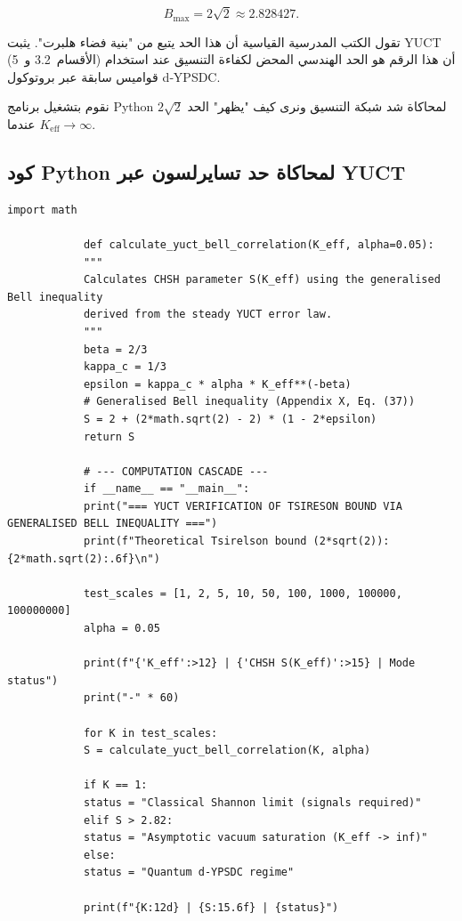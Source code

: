 \documentclass[11pt,a4paper]{article}
\makeatletter
\def\ttfamily{\@noligs\fontfamily\ttdefault\selectfont\sloppy}
\makeatother
\begin{document}
	\[
	B_{\mathrm{max}} = 2\sqrt{2} \approx 2.828427.
	\]
	
	تقول الكتب المدرسية القياسية أن هذا الحد يتبع من "بنية فضاء هلبرت". يثبت YUCT (الأقسام~3.2 و~5) أن هذا الرقم هو الحد الهندسي المحض لكفاءة التنسيق عند استخدام قواميس سابقة عبر بروتوكول d‑YPSDC.
	
	نقوم بتشغيل برنامج Python لمحاكاة شد شبكة التنسيق ونرى كيف "يظهر" الحد \(2\sqrt{2}\) عندما \(K_{\mathrm{eff}} \to \infty\).
	
	\subsection{كود Python لمحاكاة حد تسايرلسون عبر YUCT}
	
	\begin{tcolorbox}[
		colback=gray!5, 
		colframe=black!75, 
		title=كود YUCT Python: حد تسايرلسون عبر متراجحة بل المعممة,
		fonttitle=\small\ttfamily,
		arc=2mm,
		fontupper=\scriptsize,
		left=1mm, right=1mm,
		top=1mm, bottom=1mm
		]
		\begin{lstlisting}[basicstyle=\scriptsize\ttfamily, breaklines=true, columns=fullflexible]
			import math
			
			def calculate_yuct_bell_correlation(K_eff, alpha=0.05):
			"""
			Calculates CHSH parameter S(K_eff) using the generalised Bell inequality
			derived from the steady YUCT error law.
			"""
			beta = 2/3
			kappa_c = 1/3
			epsilon = kappa_c * alpha * K_eff**(-beta)
			# Generalised Bell inequality (Appendix X, Eq. (37))
			S = 2 + (2*math.sqrt(2) - 2) * (1 - 2*epsilon)
			return S
			
			# --- COMPUTATION CASCADE ---
			if __name__ == "__main__":
			print("=== YUCT VERIFICATION OF TSIRESON BOUND VIA GENERALISED BELL INEQUALITY ===")
			print(f"Theoretical Tsirelson bound (2*sqrt(2)): {2*math.sqrt(2):.6f}\n")
			
			test_scales = [1, 2, 5, 10, 50, 100, 1000, 100000, 100000000]
			alpha = 0.05
			
			print(f"{'K_eff':>12} | {'CHSH S(K_eff)':>15} | Mode status")
			print("-" * 60)
			
			for K in test_scales:
			S = calculate_yuct_bell_correlation(K, alpha)
			
			if K == 1:
			status = "Classical Shannon limit (signals required)"
			elif S > 2.82:
			status = "Asymptotic vacuum saturation (K_eff -> inf)"
			else:
			status = "Quantum d-YPSDC regime"
			
			print(f"{K:12d} | {S:15.6f} | {status}")
		\end{lstlisting}
	\end{tcolorbox}
	
\end{document}
